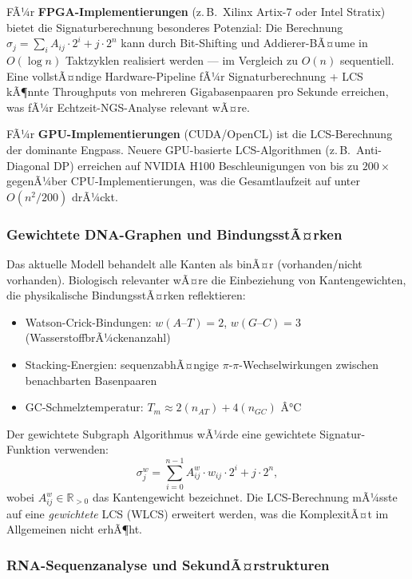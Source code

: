 ﻿\documentclass[a4paper,12pt]{article}
\theoremstyle{definition}
\begin{document}
FÃ¼r \textbf{FPGA-Implementierungen} (z.\,B.\ Xilinx Artix-7 oder Intel Stratix)
bietet die Signaturberechnung besonderes Potenzial: Die Berechnung
$\sigma_j = \sum_{i} A_{ij} \cdot 2^i + j \cdot 2^n$ kann durch Bit-Shifting
und Addierer-BÃ¤ume in $O(\log n)$ Taktzyklen realisiert werden --- im Vergleich
zu $O(n)$ sequentiell. Eine vollstÃ¤ndige Hardware-Pipeline fÃ¼r
Signaturberechnung + LCS kÃ¶nnte Throughputs von mehreren Gigabasenpaaren
pro Sekunde erreichen, was fÃ¼r Echtzeit-NGS-Analyse relevant wÃ¤re.

FÃ¼r \textbf{GPU-Implementierungen} (CUDA/OpenCL) ist die LCS-Berechnung
der dominante Engpass. Neuere GPU-basierte LCS-Algorithmen (z.\,B.\ Anti-Diagonal
DP) erreichen auf NVIDIA H100 Beschleunigungen von bis zu $200\times$ gegenÃ¼ber
CPU-Implementierungen, was die Gesamtlaufzeit auf unter $O(n^2 / 200)$ drÃ¼ckt.

\subsubsection{Gewichtete DNA-Graphen und BindungsstÃ¤rken}

Das aktuelle Modell behandelt alle Kanten als binÃ¤r (vorhanden/nicht vorhanden).
Biologisch relevanter wÃ¤re die Einbeziehung von Kantengewichten, die
physikalische BindungsstÃ¤rken reflektieren:

\begin{itemize}
	\item Watson-Crick-Bindungen: $w(A \text{--} T) = 2$,
	$w(G \text{--} C) = 3$ (WasserstoffbrÃ¼ckenanzahl)
	\item Stacking-Energien: sequenzabhÃ¤ngige $\pi$-$\pi$-Wechselwirkungen
	zwischen benachbarten Basenpaaren
	\item GC-Schmelztemperatur: $T_m \approx 2(n_{AT}) + 4(n_{GC})$ Â°C
\end{itemize}

Der gewichtete Subgraph Algorithmus wÃ¼rde eine gewichtete Signatur-Funktion
verwenden:
\[
\sigma_j^w = \sum_{i=0}^{n-1} A_{ij}^w \cdot w_{ij} \cdot 2^i + j \cdot 2^n,
\]
wobei $A_{ij}^w \in \mathbb{R}_{>0}$ das Kantengewicht bezeichnet.
Die LCS-Berechnung mÃ¼sste auf eine \textit{gewichtete} LCS (WLCS) erweitert
werden, was die KomplexitÃ¤t im Allgemeinen nicht erhÃ¶ht.

\subsubsection{RNA-Sequenzanalyse und SekundÃ¤rstrukturen}
\end{document}
